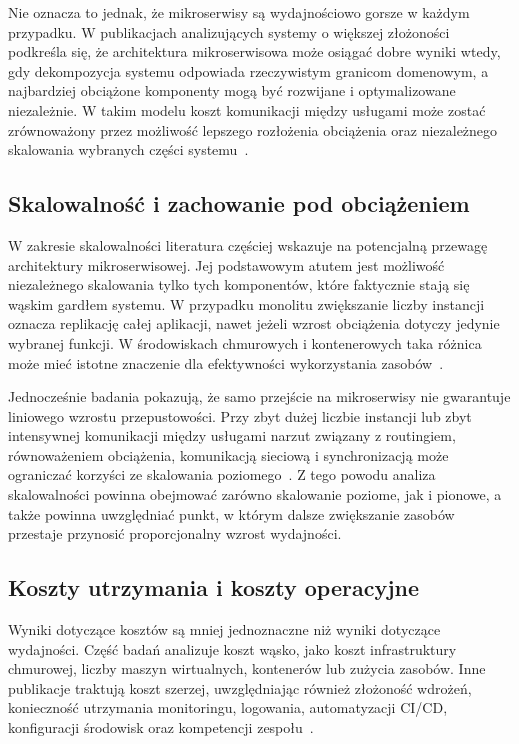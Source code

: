Nie oznacza to jednak, że mikroserwisy są wydajnościowo gorsze w każdym przypadku. W publikacjach analizujących systemy o większej złożoności podkreśla się, że architektura mikroserwisowa może osiągać dobre wyniki wtedy, gdy dekompozycja systemu odpowiada rzeczywistym granicom domenowym, a najbardziej obciążone komponenty mogą być rozwijane i optymalizowane niezależnie. W takim modelu koszt komunikacji między usługami może zostać zrównoważony przez możliwość lepszego rozłożenia obciążenia oraz niezależnego skalowania wybranych części systemu~\cite{tapia2020monolithic,nayim2023ecommerce,adrio2023graphql,kader2025streaming}.

\subsection{Skalowalność i zachowanie pod obciążeniem}

W zakresie skalowalności literatura częściej wskazuje na potencjalną przewagę architektury mikroserwisowej. Jej podstawowym atutem jest możliwość niezależnego skalowania tylko tych komponentów, które faktycznie stają się wąskim gardłem systemu. W przypadku monolitu zwiększanie liczby instancji oznacza replikację całej aplikacji, nawet jeżeli wzrost obciążenia dotyczy jedynie wybranej funkcji. W środowiskach chmurowych i kontenerowych taka różnica może mieć istotne znaczenie dla efektywności wykorzystania zasobów~\cite{blinowski2022monolithic,mangwani2022container,mangwani2023evaluation,okroj2023differences}.

Jednocześnie badania pokazują, że samo przejście na mikroserwisy nie gwarantuje liniowego wzrostu przepustowości. Przy zbyt dużej liczbie instancji lub zbyt intensywnej komunikacji między usługami narzut związany z routingiem, równoważeniem obciążenia, komunikacją sieciową i synchronizacją może ograniczać korzyści ze skalowania poziomego~\cite{blinowski2022monolithic,okroj2023differences,bernsteiner2025performance}. Z tego powodu analiza skalowalności powinna obejmować zarówno skalowanie poziome, jak i pionowe, a także powinna uwzględniać punkt, w którym dalsze zwiększanie zasobów przestaje przynosić proporcjonalny wzrost wydajności.

\subsection{Koszty utrzymania i koszty operacyjne}

Wyniki dotyczące kosztów są mniej jednoznaczne niż wyniki dotyczące wydajności. Część badań analizuje koszt wąsko, jako koszt infrastruktury chmurowej, liczby maszyn wirtualnych, kontenerów lub zużycia zasobów. Inne publikacje traktują koszt szerzej, uwzględniając również złożoność wdrożeń, konieczność utrzymania monitoringu, logowania, automatyzacji CI/CD, konfiguracji środowisk oraz kompetencji zespołu~\cite{villamizar2017cost,papakonstantinou2020technoeconomic,fontanadenardin2021energy}.

